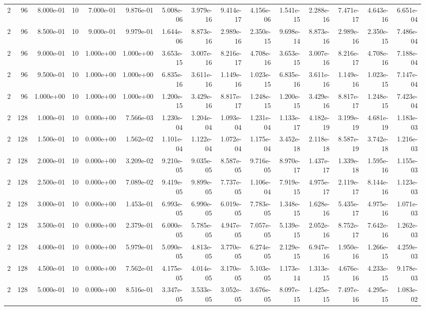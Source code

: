 \begin{tabular}{rrrrrrrrrrrrrrr}
2 & 96 & 8.000e-01 & 10 & 7.000e-01 & 9.876e-01 & 5.008e-06 & 3.979e-16 & 9.414e-17 & 4.156e-06 & 1.541e-15 & 2.288e-16 & 7.471e-17 & 4.643e-16 & 6.651e-04 \\
2 & 96 & 8.500e-01 & 10 & 9.000e-01 & 9.979e-01 & 1.644e-06 & 8.873e-16 & 2.989e-16 & 2.350e-15 & 9.698e-14 & 8.873e-16 & 2.989e-16 & 2.350e-15 & 7.486e-04 \\
2 & 96 & 9.000e-01 & 10 & 1.000e+00 & 1.000e+00 & 3.653e-15 & 3.007e-16 & 8.216e-17 & 4.708e-16 & 3.653e-15 & 3.007e-16 & 8.216e-17 & 4.708e-16 & 7.188e-04 \\
2 & 96 & 9.500e-01 & 10 & 1.000e+00 & 1.000e+00 & 6.835e-16 & 3.611e-16 & 1.149e-16 & 1.023e-15 & 6.835e-16 & 3.611e-16 & 1.149e-16 & 1.023e-15 & 7.147e-04 \\
2 & 96 & 1.000e+00 & 10 & 1.000e+00 & 1.000e+00 & 1.200e-15 & 3.429e-16 & 8.817e-17 & 1.248e-15 & 1.200e-15 & 3.429e-16 & 8.817e-17 & 1.248e-15 & 7.423e-04 \\
2 & 128 & 1.000e-01 & 10 & 0.000e+00 & 7.566e-03 & 1.230e-04 & 1.204e-04 & 1.093e-04 & 1.231e-04 & 1.133e-17 & 4.182e-19 & 3.199e-19 & 4.681e-19 & 1.183e-03 \\
2 & 128 & 1.500e-01 & 10 & 0.000e+00 & 1.562e-02 & 1.101e-04 & 1.122e-04 & 1.072e-04 & 1.175e-04 & 3.452e-18 & 2.118e-18 & 8.587e-19 & 3.742e-18 & 1.216e-03 \\
2 & 128 & 2.000e-01 & 10 & 0.000e+00 & 3.209e-02 & 9.210e-05 & 9.035e-05 & 8.587e-05 & 9.716e-05 & 8.970e-17 & 1.437e-17 & 1.339e-18 & 1.595e-16 & 1.155e-03 \\
2 & 128 & 2.500e-01 & 10 & 0.000e+00 & 7.089e-02 & 9.419e-05 & 9.899e-05 & 7.737e-05 & 1.106e-04 & 7.919e-15 & 4.975e-17 & 2.119e-17 & 8.144e-16 & 1.123e-03 \\
2 & 128 & 3.000e-01 & 10 & 0.000e+00 & 1.453e-01 & 6.993e-05 & 6.990e-05 & 6.019e-05 & 7.783e-05 & 1.348e-15 & 1.628e-16 & 5.435e-17 & 4.975e-16 & 1.071e-03 \\
2 & 128 & 3.500e-01 & 10 & 0.000e+00 & 2.379e-01 & 6.000e-05 & 5.785e-05 & 4.947e-05 & 7.057e-05 & 5.139e-15 & 2.052e-16 & 8.752e-17 & 7.642e-16 & 1.262e-03 \\
2 & 128 & 4.000e-01 & 10 & 0.000e+00 & 5.979e-01 & 5.090e-05 & 4.813e-05 & 3.770e-05 & 6.274e-05 & 2.129e-15 & 6.947e-16 & 1.950e-16 & 1.266e-15 & 4.259e-03 \\
2 & 128 & 4.500e-01 & 10 & 0.000e+00 & 7.562e-01 & 4.175e-05 & 4.014e-05 & 3.170e-05 & 5.103e-05 & 1.173e-14 & 1.313e-15 & 4.676e-16 & 4.233e-15 & 9.178e-03 \\
2 & 128 & 5.000e-01 & 10 & 0.000e+00 & 8.516e-01 & 3.347e-05 & 3.533e-05 & 3.052e-05 & 3.676e-05 & 8.097e-15 & 1.425e-15 & 7.497e-16 & 4.295e-15 & 1.083e-02 \\

\end{tabular}
